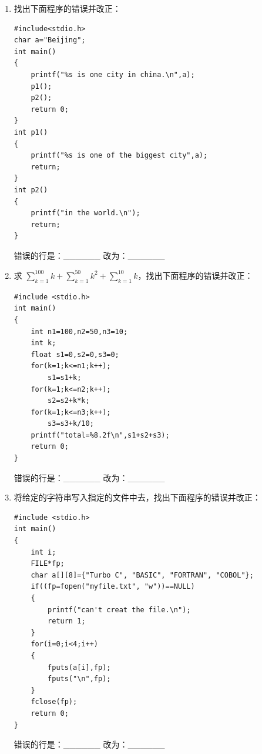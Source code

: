 \documentclass[a4paper,12pt]{article}
\begin{document}
\begin{enumerate}
	\item 找出下面程序的错误并改正：
	      \begin{verbatim}
#include<stdio.h>
char a="Beijing";
int main()
{
    printf("%s is one city in china.\n",a);
    p1();
    p2();
    return 0;
}
int p1()
{
    printf("%s is one of the biggest city",a);
    return;
}
int p2()
{
    printf("in the world.\n");
    return;
}
    \end{verbatim}
	      错误的行是：\_\_\_\_\_\_ 改为：\_\_\_\_\_\_
	      \vspace{0.3cm}

	\item 求 $\sum_{k=1}^{100} k + \sum_{k=1}^{50} k^2 + \sum_{k=1}^{10} k$，找出下面程序的错误并改正：
	      \begin{verbatim}
#include <stdio.h>
int main()
{
    int n1=100,n2=50,n3=10;
    int k;
    float s1=0,s2=0,s3=0;
    for(k=1;k<=n1;k++);
        s1=s1+k;
    for(k=1;k<=n2;k++);
        s2=s2+k*k;
    for(k=1;k<=n3;k++);
        s3=s3+k/10;
    printf("total=%8.2f\n",s1+s2+s3);
    return 0;
}
    \end{verbatim}
	      错误的行是：\_\_\_\_\_\_ 改为：\_\_\_\_\_\_
	      \vspace{0.3cm}

	\item 将给定的字符串写入指定的文件中去，找出下面程序的错误并改正：
	      \begin{verbatim}
#include <stdio.h>
int main()
{
    int i;
    FILE*fp;
    char a[][8]={"Turbo C", "BASIC", "FORTRAN", "COBOL"};
    if((fp=fopen("myfile.txt", "w"))==NULL)
    {
        printf("can't creat the file.\n");
        return 1;
    }
    for(i=0;i<4;i++)
    {
        fputs(a[i],fp);
        fputs("\n",fp);
    }
    fclose(fp);
    return 0;
}
    \end{verbatim}
	      错误的行是：\_\_\_\_\_\_ 改为：\_\_\_\_\_\_
	      \vspace{0.3cm}
\end{enumerate}
\end{document}
